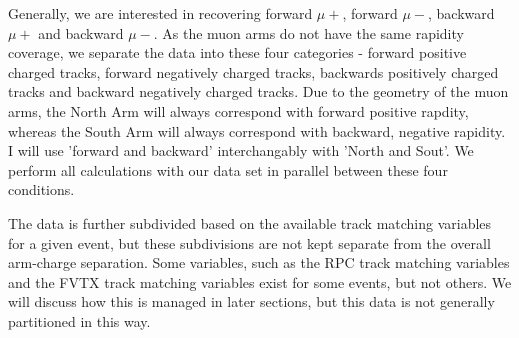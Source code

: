 Generally, we are interested in recovering forward $\mu+$, forward $\mu-$,
backward $\mu+$ and backward $\mu-$. As the muon arms do not have the same
rapidity coverage, we separate the data into these four categories - forward
positive charged tracks, forward negatively charged tracks, backwards positively
charged tracks and backward negatively charged tracks. Due to the geometry of
the muon arms, the North Arm will always correspond with forward positive
rapdity, whereas the South Arm will always correspond with backward, negative
rapidity. I will use 'forward and backward' interchangably with 'North and
Sout'. We perform all calculations with our data set in parallel between these
four conditions.

The data is further subdivided based on the available track matching variables
for a given event, but these subdivisions are not kept separate from the
overall arm-charge separation. Some variables, such as the RPC track matching
variables and the FVTX track matching variables exist for some events, but not
others. We will discuss how this is managed in later sections, but this data is
not generally partitioned in this way.

\clearpage
